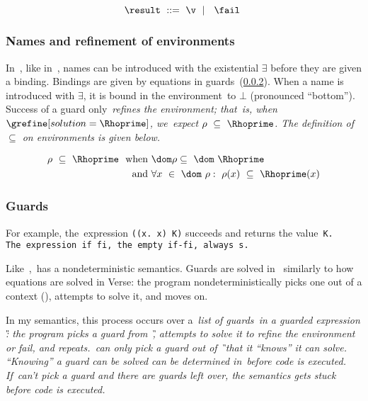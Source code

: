 \documentclass[manuscript,screen 12pt, nonacm]{acmart}
\begin{document}
    \[\result\;~\rm{::=}\;~\v\;~\vert~\;~\fail~\]
    

    \subsubsection{Names and refinement of environments}

    In~\VMinus, like in~\VC, names can be introduced with the existential
    {$\exists$} before they are given a binding. Bindings are given by equations
    in guards~(\ref{guards}). When a name is introduced with {$\exists$}, it is
    bound in the environment~\Rho to $\bot$ (pronounced “bottom”). Success of a
    guard only~\it{refines} the environment; that~is, when
    $\grefine[solution=\Rhoprime]$, we~expect $\rho~\subseteq~\Rhoprime$. The
    definition of $\subseteq$ on environments is given below. 
    
    \begin{align*}
    \rho~\subseteq~\Rhoprime~\text{ when }&\dom\rho  \subseteq~\dom~\Rhoprime\\
    \text{ and } &\forall x~\in~\dom~\rho:~\rho(x)~\subseteq~\Rhoprime(x)
    \end{align*}
    
    \medskip
        
    \subsubsection{Guards}
    \label{guards}

    For example, the~\VMinus expression {\tt{((}\ttbackslash\tt{x. x) K)}}
    succeeds and returns the value~\tt{K}. The~\VMinus expression~\tt{if  fi},
    the empty~\tt{if-fi}, always {\fail}s. 

    Like~\VC,~\VMinus has a nondeterministic semantics. Guards are solved in~\VMinus
    similarly to how equations are solved in Verse: the program nondeterministically
    picks one out of a context (\context), attempts to solve it, and moves on. 

In my semantics, this process occurs over a~\it{list} of guards~\gs in a guarded
expression \G: the program picks a guard from~\G, attempts to solve it to refine
the environment or fail, and repeats.~\VMinus can only pick a guard out of \G\
that it “knows” it can solve. “Knowing” a guard can be solved can be determined
in~\VMinus before code is executed. If~\VMinus can't pick a guard and there are
guards left over, the semantics gets stuck before code is executed. 
\end{document}
